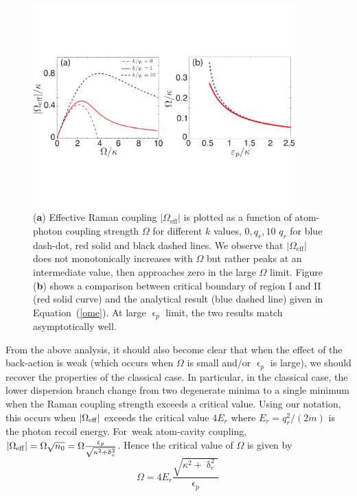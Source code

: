 \documentclass[atoms,article,accept,moreauthors,pdftex,12pt,a4paper]{mdpi}
\begin{document}
\begin{figure}[H]
\centering
\includegraphics[width=0.9\textwidth]{fig2} \vspace{12pt}
\caption{(\textbf{a}) Effective Raman coupling $|\Omega_\text{eff}|$ is plotted as a function of atom-photon coupling strength $\Omega$ for different $k$ values, $0$,\,$q_r$,\,$10$ $q_r$ for blue dash-dot, red solid and black dashed  lines. We observe that $|\Omega_\text{eff}|$ does not monotonically  increases with $\Omega$ but rather peaks at an intermediate value, then approaches zero in the large $\Omega$ limit. Figure (\textbf{b}) shows a comparison between critical boundary of region I and II (red solid curve) and the analytical result (blue dashed line) given in Equation~(\ref{ome}). At large $\upvarepsilon_p$ limit, the two results match asymptotically well.  }\label{fig2}
\end{figure}



From the above analysis, it should also become clear that when the effect of the back-action is weak (which occurs when $\Omega$ is small and/or $\upvarepsilon_p$ is large), we should recover the properties of the classical case. In particular, in the classical case, the lower dispersion branch change from two degenerate minima to a single minimum when the Raman coupling strength exceeds a critical value. Using our notation, this occurs when $|\Omega_{\rm eff}|$ exceeds the critical value $4E_r$ where $E_r=q_r^2/(2m)$ is the photon recoil energy. For~weak atom-cavity coupling, $|\Omega_{\rm eff}| = \Omega \sqrt{n_0}={\Omega} \frac{\upvarepsilon_p}{\sqrt{\kappa^2+ \updelta_c^2}}$. Hence the critical value of $\Omega$ is given by
\begin{equation}
\Omega=4E_r\frac{\sqrt{\kappa^2+\updelta_c^2}}{\upvarepsilon_p}\,
\label{ome}
\end{equation}
\end{document}
